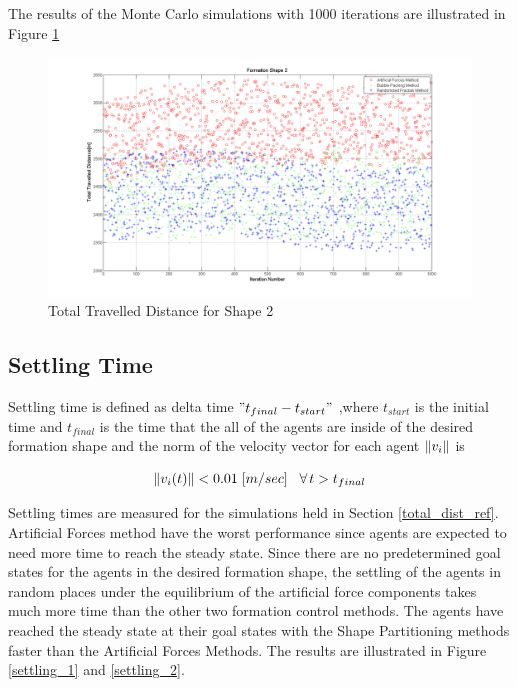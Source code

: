 The results of the Monte Carlo simulations with 1000 iterations are illustrated in Figure \ref{total_dist_2}

\begin{figure}[H]
\caption{Total Travelled Distance for Shape 2} \label{total_dist_2}
\centerline{\includegraphics[scale = 0.35]{Total_Energy_Shape_2}} 
\end{figure} 	
		   
\subsection{Settling Time} \label{settling_ref}
Settling time is defined as delta time $"t_{final} - t_{start}"$ ,where $t_{start}$ is the initial time and $t_{final}$ is the time that the all of the agents are inside of the desired formation shape and the norm of the velocity vector for each agent $\left\lVert v_i\right\rVert$ is
		
\begin{equation}
\left\lVert v_i(t)\right\rVert < 0.01 \hspace{0.1cm} [m/sec] \hspace{0.3cm}\forall\hspace{0.05cm} t>t_{final}
\end{equation}
		
Settling times are measured for the simulations held in Section \ref{total_dist_ref}. Artificial Forces method have the worst performance since agents are expected to need more time to reach the steady state. Since there are no predetermined goal states for the agents in the desired formation shape, the settling of the agents in random places under the equilibrium of the artificial force components takes much more time than the other two formation control methods. The agents have reached the steady state at their goal states with the Shape Partitioning methods faster than the Artificial Forces Methods. The results are illustrated in Figure \ref{settling_1} and \ref{settling_2}.
		
